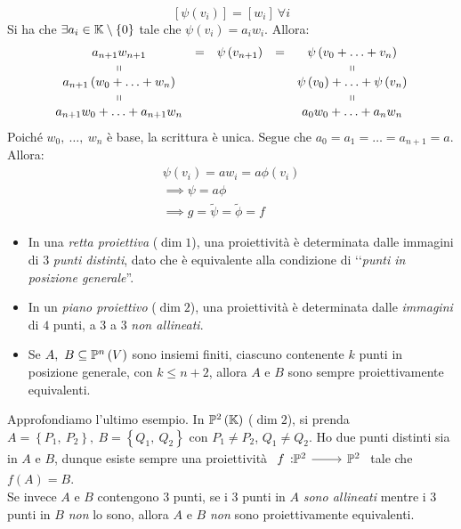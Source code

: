 \begin{demonstration}
\begin{itemize}
\begin{equation*}
	\left[\psi\left(v_i\right)\right]=\left[w_i\right]\ \forall i
\end{equation*}
Si ha che $\exists a_i\in\mathbb{K}\setminus\left\{0\right\}$ tale che $\psi\left(v_i\right)=a_iw_i$. Allora:
\begin{equation*}
	\begin{array}{ccccc}
		a_{n+1}w_{n+1}&=&\psi\left(v_{n+1}\right)&=&\psi\left(v_0+\ldots+v_n\right)\\
		\shortparallel&&&&\shortparallel\\
		a_{n+1}\left(w_0+\ldots+w_n\right)&&&&\psi\left(v_0\right)+\ldots+\psi\left(v_n\right)\\
		\shortparallel&&&&\shortparallel\\
		a_{n+1}w_0+\ldots+a_{n+1}w_n&&&&a_0w_0+\ldots+a_nw_n
	\end{array}
\end{equation*}
Poiché $w_0,\ \ldots,\ w_n$ è base, la scrittura è unica. Segue che $a_0=a_1=\ldots=a_{n+1}=a$. Allora:
\begin{equation*}
	\begin{array}{l}
		\psi\left(v_i\right)=aw_i=a\phi\left(v_i\right)\\
		\implies \psi=a\phi\\
		\implies g=\tilde{\psi}=\tilde{\phi}=f
	\end{array}
\end{equation*}
	\end{itemize}
\end{demonstration}
\begin{examples}
	\begin{itemize}
		\item In una \textit{retta proiettiva} ($\dim 1$), una proiettività è determinata dalle immagini di $3$ \textit{punti distinti}, dato che è equivalente alla condizione di ‘‘\textit{punti in posizione generale}''.
		\item In un \textit{piano proiettivo} ($\dim 2$), una proiettività è determinata dalle \textit{immagini} di $4$ punti, a $3$ a $3$ \textit{non allineati}.
		\item Se $A,\ B\subseteq \proj{V}$ sono insiemi finiti, ciascuno contenente $k$ punti in posizione generale, con $k\leq n+2$, allora $A$ e $B$ sono sempre proiettivamente equivalenti.
	\end{itemize}
\end{examples}
\begin{example}
	Approfondiamo l'ultimo esempio. In $\proj[2]{\kamp}$ ($\dim 2$), si prenda $A=\left\{P_1,\ P_2\right\},\ B=\left\{Q_1,\ Q_2\right\}$ con $P_1\neq P_2$, $Q_1\neq Q_2$. Ho due punti distinti sia in $A$ e $B$, dunque esiste sempre una proiettività $\funz{f}{\proj[2]{\ }}{\proj[2]{\ }}$ tale che $f\left(A\right)=B$.\\
	Se invece $A$ e $B$ contengono $3$ punti, se i $3$ punti in $A$ \textit{sono allineati} mentre i $3$ punti in $B$ \textit{non} lo sono, allora $A$ e $B$ \textit{non} sono proiettivamente equivalenti.
\end{example}
